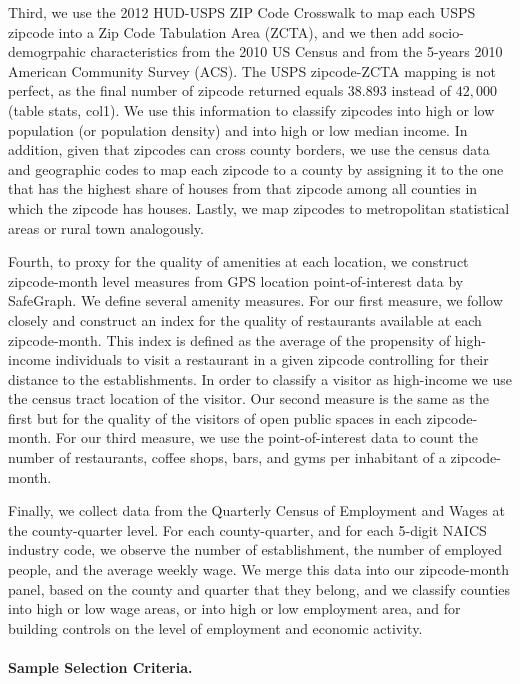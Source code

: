 Third, we use the 2012 HUD-USPS ZIP Code Crosswalk to map each USPS zipcode into a Zip Code Tabulation Area (ZCTA), and we then add socio-demogrpahic characteristics from the 2010 US Census and from the 5-years 2010 American Community Survey (ACS). The USPS zipcode-ZCTA mapping is not perfect, as the final number of zipcode returned equals $38.893$ instead of $42,000$ (table stats, col1). We use this information to classify zipcodes into high or low population (or population density) and into high or low median income. In addition, given that zipcodes can cross county borders, we use the census data and geographic codes to map each zipcode to a county by assigning it to the one that has the highest share of houses from that zipcode among all counties in which the zipcode has houses. Lastly, we map zipcodes to metropolitan statistical areas or rural town analogously.

Fourth, to proxy for the quality of amenities at each location, we construct zipcode-month level measures from GPS location point-of-interest data by SafeGraph\parencite{safegraph}. We define several amenity measures. For our first measure, we follow closely \textcite{couture2019income} and construct an index for the quality of restaurants available at each zipcode-month. This index is defined as the average of the propensity of high-income individuals to visit a restaurant in a given zipcode controlling for their distance to the establishments. In order to classify a visitor as high-income we use the census tract location of the visitor. Our second measure is the same as the first but for the quality of the visitors of open public spaces in each zipcode-month. For our third measure, we use the point-of-interest data to count the number of restaurants, coffee shops, bars, and gyms per inhabitant of a zipcode-month. 

Finally, we collect data from the Quarterly Census of Employment and Wages at the county-quarter level. For each county-quarter, and for each 5-digit NAICS industry code, we observe the number of establishment, the number of employed people, and the average weekly wage. We merge this data into our zipcode-month panel, based on the county and quarter that they belong, and we classify counties into high or low wage areas, or into high or low employment area, and for building controls on the level of employment and economic activity. 


\paragraph{Sample Selection Criteria.}

